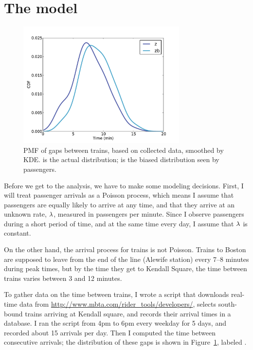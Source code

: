 \documentclass[12pt]{book}
\theoremstyle{exercise}
\begin{document}
\section{The model}

\begin{figure}
\centerline{\includegraphics[height=2.5in]{figs/redline0.pdf}}
\caption{PMF of gaps between trains, based on collected data,
smoothed by KDE.   is the actual distribution; 
is the biased distribution seen by passengers. }
\label{fig.redline0}
\end{figure}

Before we get to the analysis, we have to make some
modeling decisions.  First, I will treat passenger arrivals as
a Poisson process, which means I assume that passengers are equally
likely to arrive at any time, and that they arrive at an unknown
rate, $\mathtt{\lambda}$, measured in passengers per minute.  Since I
observe passengers during a short period of time, and at the same
time every day, I assume that $\mathtt{\lambda}$ is constant.

On the other hand, the arrival process for trains is not Poisson.
Trains to Boston are supposed to leave from the end of the line
(Alewife station) every 7--8 minutes during peak times, but by the time
they get to Kendall Square, the time between trains varies between 3
and 12 minutes.

To gather data on the time between trains, I wrote a script that
downloads real-time data from
\url{http://www.mbta.com/rider_tools/developers/}, selects south-bound
trains arriving at Kendall square, and records their arrival times
in a database.  I ran the script from 4pm to 6pm every weekday
for 5 days, and recorded about 15 arrivals per day.  Then
I computed the time between consecutive arrivals; the distribution
of these gaps is shown in Figure~\ref{fig.redline0}, labeled .
\end{document}
